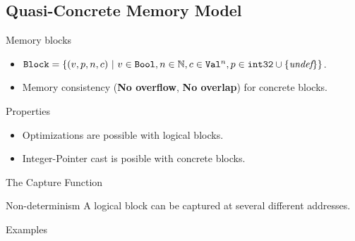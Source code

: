 \subsection{Quasi-Concrete Memory Model}
\begin{frame}{\subsecname}

  \begin{block}{Memory blocks}
    \begin{itemize}
    \item $\texttt{Block}=\{(v,p,n,c)~|~v\in\texttt{Bool},n\in\mathbb{N},c\in\texttt{Val}^{n},p\in\texttt{int32}\cup\{\textit{undef}\}\}$.
    \item Memory consistency (\textbf{No overflow}, \textbf{No overlap}) for concrete blocks.
    \end{itemize}
  \end{block}
  \vfill
  \begin{exampleblock}{Properties}
    \begin{itemize}
    \item Optimizations are possible with logical blocks.
    \item Integer-Pointer cast is posible with concrete blocks.
    \end{itemize}
  \end{exampleblock}
  
\end{frame}

\begin{frame}{The Capture Function}

  \begin{minipage}{0.48\textwidth}
    
  \end{minipage}
  \begin{minipage}{0.48\textwidth}
    
  \end{minipage}
  \vfill
  \begin{alertblock}{Non-determinism}
    A logical block can be captured at several different addresses.
  \end{alertblock}
  
\end{frame}

\begin{frame}{Examples}

  \begin{minipage}{0.48\textwidth}
    
  \end{minipage}
  \begin{minipage}{0.48\textwidth}
    
  \end{minipage}
  \vfill
  

\end{frame}
